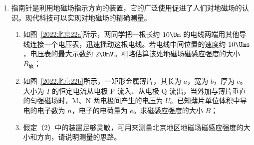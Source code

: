 \documentclass[\gkver]{gaokaozhenti}
\begin{document}
\begin{enumerate}
{设恒星质量为 $M$，地球在轨道上运行周期为 $T$，万有引力提供向心力，有

$\frac{GMm}{r^{2}} = mr\frac{4\pi^{2}}{T^{2}}$

解得

$T = \sqrt{\frac{4\pi^{2}r^{3}}{GM}}$

由于恒星质量是太阳质量的 2 倍，得 $\frac{T_{2}}{T_{1}} = 4\sqrt{2}$。
}

\item
指南针是利用地磁场指示方向的装置，它的广泛使用促进了人们对地磁场的认识。现代科技可以实现对地磁场的精确测量。
\begin{enumerate}
	\item
	如图~\ref{2022北京22a}所示，两同学把一根长约 $10\Um$ 的电线两端用其他导线连接一个电压表，迅速摇动这根电线。若电线中间位置的速度约 $10\Ums$，电压表的最大示数约 $2\UmV$。粗略估算该处地磁场磁感应强度的大小 $B_{\text{地}}$；
	\item
	如图~\ref{2022北京22b}所示，一矩形金属薄片，其长为 $a$，宽为 $b$，厚为 $c$。大小为 $I$ 的恒定电流从电极 P 流入、从电极 Q 流出，当外加与薄片垂直的匀强磁场时，M、N 两电极间产生的电压为 $U$。已知薄片单位体积中导电的电子数为 $n$，电子的电荷量为 $e$。求磁感应强度的大小 $B$；
	\item
	假定（2）中的装置足够灵敏，可用来测量北京地区地磁场磁感应强度的大小和方向，请说明测量的思路。
\end{enumerate}


\end{enumerate}
\end{document}
